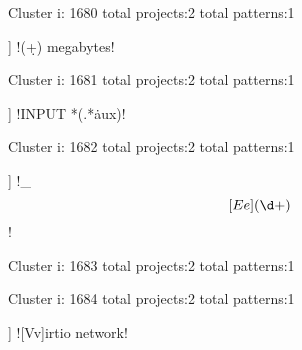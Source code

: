 Cluster i: 1680
total projects:2
total patterns:1
\begin{multicols}{1}
\begin{description}[noitemsep,topsep=0pt]
\item [[2] ] \cverb!(\d+) megabytes!
\end{description}
\end{multicols}







Cluster i: 1681
total projects:2
total patterns:1
\begin{multicols}{1}
\begin{description}[noitemsep,topsep=0pt]
\item [[2] ] \cverb!INPUT *(.*\.aux)!
\end{description}
\end{multicols}







Cluster i: 1682
total projects:2
total patterns:1
\begin{multicols}{1}
\begin{description}[noitemsep,topsep=0pt]
\item [[2] ] \cverb!_\[[Ee](\d+)\]!
\end{description}
\end{multicols}







Cluster i: 1683
total projects:2
total patterns:1
\begin{multicols}{1}
\end{multicols}







Cluster i: 1684
total projects:2
total patterns:1
\begin{multicols}{1}
\begin{description}[noitemsep,topsep=0pt]
\item [[2] ] \cverb![Vv]irtio network!
\end{description}
\end{multicols}







